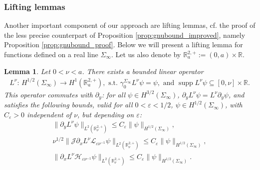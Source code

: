 \documentclass[report]{elsarticle}
\newtheorem{lemma}[theorem]{Lemma}
\numberwithin{theorem}{section}
\newcommand{\re}{\varepsilon}
\begin{document}
\subsubsection{{Lifting lemmas}} 
Another important component of our approach are lifting lemmas, cf. the proof of the less precise counterpart of Proposition \ref{prop:gnubound_improved}, namely Proposition \ref{prop:gnubound_proof}. Below we will present a lifting lemma for functions defined on a real line $\Sigma_{\infty}$. 
Let us also denote by $\mathbb{R}^{2,+}_{a}:=(0,a)\times \mathbb{R}$. %
\begin{lemma}
	\label{lem:lifting_lem_important}
	Let $0<\nu<a$. There exists a bounded linear operator 
	\begin{align*}
		L^{\nu}: \, H^{1/2}(\Sigma_{\infty})\rightarrow H^{1}(\mathbb{R}^{2,+}_a),\text{ s.t. }\gamma_0^{\Sigma_{\infty}}L^{\nu}\psi=\psi,\text{ and } \operatorname{supp}L^{\nu}\psi\subseteq [0,\nu]\times\mathbb{R}.
	\end{align*}
	This operator commutes with $\partial_y$: for all $\psi\in H^{3/2}(\Sigma_{\infty})$, $\partial_y L^{\nu}\psi=L^{\nu}\partial_y \psi$, and satisfies the following bounds, valid for all $0<\re<1/2$, $\psi\in H^{1/2}(\Sigma_{\infty})$, with $C_{\re}>0$ independent of $\nu$, but depending on $\re$:
	\begin{align}
		\label{eq:psibound_start0_mt}
		\|\partial_yL^{\nu}\psi\|_{L^2(\mathbb{R}^{2,+}_{\nu})}\leq C_{\re}\|\psi\|_{H^{1/2}(\Sigma_{\infty})},\\
		\label{eq:psibound_start_dx_mt}
		\nu^{1/2}\|\mathcal{J}\partial_x L^{\nu}\mathcal{L}_{\re\nu^{-1}}\psi\|_{L^2(\mathbb{R}^{2,+}_{\nu})}\leq C_{\re}\|\psi\|_{H^{1/2}(\Sigma_{\infty})},\\
		\label{eq:partialy_psibound_mt}
		\|\partial_x L^{\nu}\mathcal{H}_{\re\nu^{-1}}\psi\|_{L^2(\mathbb{R}^{2,+}_{\nu})}\leq C_{\re}\|\psi\|_{H^{1/2}(\Sigma_{\infty})}.
	\end{align}
\end{lemma}
\end{document}
